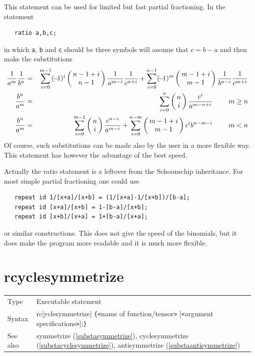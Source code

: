 \noindent This statement can be used for limited but fast 
partial fractioning. In the statement
\begin{verbatim}
   ratio a,b,c;
\end{verbatim}
in which \verb:a:, \verb:b: and \verb:c: should be three symbols {\FORM} 
will assume that $c = b-a$ and then make the substitutions
\begin{eqnarray}
    \frac{1}{a^m}\frac{1}{b^n} & = & \sum_{i=0}^{m-1}\sign{i}
        \binom{n-1+i}{n-1}\frac{1}{a^{m-i}}\frac{1}{c^{n+i}}
        +\sum_{i=0}^{n-1}\sign{m}
        \binom{m-1+i}{m-1}\frac{1}{b^{n-i}}\frac{1}{c^{m+i}}
        \nonumber \\
    \frac{b^n}{a^m} & = & \sum_{i=0}^n\binom{n}{i}\frac{c^i}{a^{m-n+i}}
            \ \ \ \ \ \ \ \hfill m\ge n \nonumber \\
    \frac{b^n}{a^m} & = & \sum_{i=0}^{m-1}\binom{n}{i}\frac{c^{n-i}}{a^{m-i}}
        + \sum_{i=0}^{n-m}\binom{m-1+i}{m-1}
            c^ib^{n-m-i}
            \ \ \ \ \ \ \ \hfill m<n \nonumber
\end{eqnarray}
\setcounter{equation}{3}
Of course, such substitutions can be made also by the user in a more 
flexible way. This statement has however the advantage of the best speed.
\vspace{4mm}

\noindent Actually the ratio statement is a leftover from the 
Schoonschip 
inheritance. For most simple partial fractioning one could use
\begin{verbatim}
   repeat id 1/[x+a]/[x+b] = (1/[x+a]-1/[x+b])/[b-a];
   repeat id [x+a]/[x+b] = 1-[b-a]/[x+b];
   repeat id [x+b]/[x+a] = 1+[b-a]/[x+a];
\end{verbatim}
or similar constructions. This does not give the speed of the 
binomials, but it does make the program more readable and 
it is much more flexible.
\vspace{10mm}

 
\section{rcyclesymmetrize}
\label{substarcyclesymmetrize}

\noindent \begin{tabular}{ll}
Type & Executable statement\\
Syntax & rc[yclesymmetrize] \verb:{:{\tt<}name of function/tensor{\tt>}
         [{\tt<}argument specifications{\tt>}];\verb:}: \\
See also & symmetrize (\ref{substasymmetrize}), cyclesymmetrize 
(\ref{substacyclesymmetrize}), antisymmetrize (\ref{substaantisymmetrize})
\end{tabular} \vspace{4mm}

